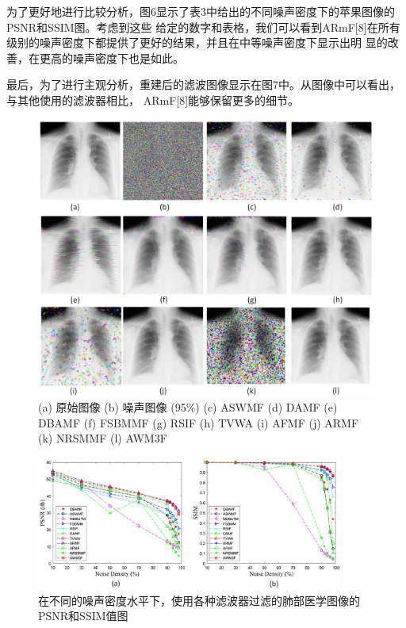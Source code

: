 \documentclass[12pt]{article} %
\begin{document}
\hspace{2em}为了更好地进行比较分析，图6显示了表3中给出的不同噪声密度下的苹果图像的PSNR和SSIM图。考虑到这些
给定的数字和表格，我们可以看到ARmF[8]在所有级别的噪声密度下都提供了更好的结果，并且在中等噪声密度下显示出明
显的改善，在更高的噪声密度下也是如此。

\hspace{2em}最后，为了进行主观分析，重建后的滤波图像显示在图7中。从图像中可以看出，与其他使用的滤波器相比，
ARmF[8]能够保留更多的细节。

\begin{figure}[H]
    \centering
    \includegraphics[width=1\textwidth]{images/11.eps}
    \caption{(a) 原始图像 (b) 噪声图像 (95\%) (c) ASWMF (d) DAMF (e) DBAMF (f) FSBMMF (g) RSIF (h) TVWA (i) AFMF (j) ARMF (k) NRSMMF (l) AWM3F}
\end{figure}

\begin{figure}[H]
    \centering
    \includegraphics[width=0.9\textwidth]{images/12.eps}
    \caption{在不同的噪声密度水平下，使用各种滤波器过滤的肺部医学图像的PSNR和SSIM值图}
\end{figure}
\end{document}

